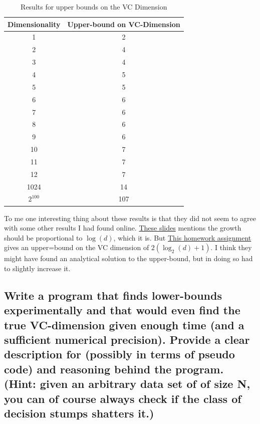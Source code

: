\documentclass[11pt,a4paper]{article}
\begin{document}
\begin{table}
    \begin{tabular}{|c|c|}
    \hline
    Dimensionality & Upper-bound on VC-Dimension \\ \hline
    1              & 2                            \\ \hline
    2              & 4                            \\ \hline
    3              & 4                            \\ \hline
    4              & 5                            \\ \hline
    5              & 5                            \\ \hline
    6              & 6                            \\ \hline
    7              & 6                           \\ \hline
    8              & 6                            \\ \hline

    9              & 6                            \\ \hline
    10              & 7                            \\ \hline
    11             & 7                            \\ \hline
    12              & 7                            \\ \hline

    
    1024           & 14                            \\ \hline
    $2^{100}$        & 107 \\
    \hline
    \end{tabular}
    \caption{Results for upper bounds on the VC Dimension}
    \label{tab:upper-bound-vc}
\end{table}

To me one interesting thing about these results is that they did not seem to agree with some other results I had found online. \href{https://people.csail.mit.edu/alinush/6.867-fall-2013/2013.10.22.w8.tu-lecture-13-generalization-part-2.pdf}{These slides} mentions the growth should be proportional to $\log(d)$, which it is. But \href{http://courses.cms.caltech.edu/cs253/hw/hw2.pdf}{This homework assignment} gives an upper=bound on the VC dimension of $2(\log_2(d) + 1)$. I think they might have found an analytical solution to the upper-bound, but in doing so had to slightly increase it.

\subsection{Write a program that finds lower-bounds experimentally and that would even find the true VC-dimension given enough time (and a sufficient numerical precision). Provide a clear description for (possibly in terms of pseudo code) and reasoning behind the program. (Hint: given an arbitrary data set of of size N, you can of course always check if the class of decision stumps shatters it.)}
\label{sec:2f}
\end{document}
